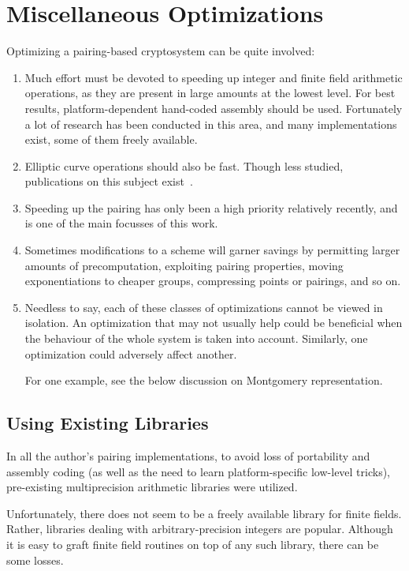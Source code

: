 \chapter{Miscellaneous Optimizations}

Optimizing a pairing-based cryptosystem can be quite involved:

\begin{enumerate}
\item
Much effort must be devoted to speeding up
integer and finite field arithmetic operations, as they are present
in large amounts at the lowest level. For best results, platform-dependent
hand-coded assembly should be used.
Fortunately a lot of research has been conducted in this area,
and many implementations exist, some of them freely available.
\item
Elliptic curve operations should also be fast. Though less studied,
publications on this subject exist~\cite{bss}.
\item
Speeding up the pairing has only been a high priority relatively recently,
and is one of the main focusses of this work.
\item
Sometimes modifications to a scheme will garner savings by
permitting larger amounts of precomputation, exploiting pairing
properties, moving exponentiations to cheaper groups, compressing points or
pairings, and so on.
\item
Needless to say, each of these classes of optimizations cannot be viewed
in isolation. An optimization that may not usually help could be beneficial
when the behaviour of the whole system is taken into account.
Similarly, one optimization could adversely affect another.

For one example, see the below
discussion on Montgomery representation.
\end{enumerate}

\section{Using Existing Libraries}

In all the author's pairing implementations, to avoid loss of portability
and assembly coding (as well as the need to learn platform-specific
low-level tricks), pre-existing multiprecision arithmetic libraries
were utilized.

Unfortunately, there does not seem to be a freely available library for
finite fields. Rather, libraries dealing with arbitrary-precision integers
are popular. Although it is easy to graft finite field routines on top
of any such library, there can be some losses.


